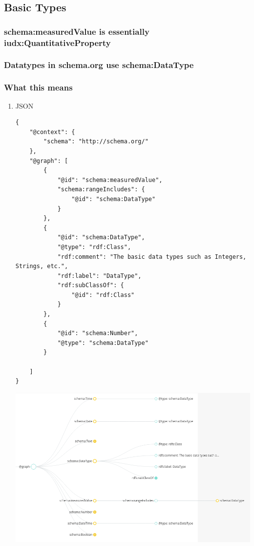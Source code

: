 \documentclass[11pt]{article}
\begin{document}
\subsection{Basic Types}
\label{sec:org57043eb}
\subsubsection{schema:measuredValue is essentially iudx:QuantitativeProperty}
\label{sec:orga0fb30e}
\subsubsection{Datatypes in schema.org use schema:DataType}
\label{sec:org065f559}
\subsubsection{What this means}
\label{sec:orgf2ca47c}
\begin{enumerate}
\item JSON
\label{sec:org8120d62}
\begin{verbatim}
{
    "@context": {
        "schema": "http://schema.org/"
    },
    "@graph": [
        {
            "@id": "schema:measuredValue",
            "schema:rangeIncludes": {
                "@id": "schema:DataType"
            }
        },
        {
            "@id": "schema:DataType",
            "@type": "rdf:Class",
            "rdf:comment": "The basic data types such as Integers, Strings, etc.",
            "rdf:label": "DataType",
            "rdf:subClassOf": {
                "@id": "rdf:Class"
            }
        },
        {
            "@id": "schema:Number",
            "@type": "schema:DataType"
        }

    ]
}
\end{verbatim}
\begin{center}
\includegraphics[width=.9\linewidth]{./datatype.png}
\end{center}
\end{enumerate}
\end{document}
